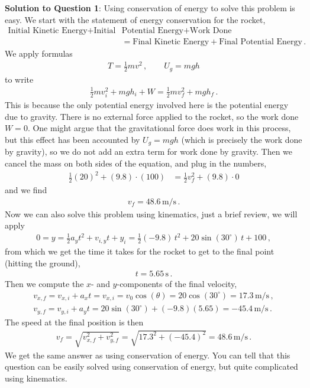 \documentclass[11pt]{article}
\begin{document}
\newpage
\textbf{Solution to Question 1}: Using conservation of energy to solve this problem is easy. We start with the statement of energy conservation for the rocket, 
\begin{align*}
\text{Initial Kinetic Energy} +
\text{Initial }&\text{Potential Energy} + \text{Work Done} \\
&= 
\text{Final Kinetic Energy} +
\text{Final Potential Energy}\,.
\end{align*}
We apply formulas 
\begin{align*}
T = \frac{1}{2}mv^2\,,\qquad
U_g = mgh
\end{align*}
to write
\begin{align*}
\frac{1}{2}mv_i^2 + mgh_i + W = \frac{1}{2}mv_f^2 + mgh_f\,.
\end{align*}
This is because the only potential energy involved here is the potential energy due to gravity. There is no external force applied to the rocket, so the work done $W = 0$. One might argue that the gravitational force does work in this process, but this effect has been accounted by $U_g = mgh$ (which is precisely the work done by gravity), so we do not add an extra term for work done by gravity. Then we cancel the mass on both sides of the equation, and plug in the numbers, 
\begin{align*}
\frac{1}{2}(20)^2 + (9.8)\cdot (100) &= \frac{1}{2}v_f^2 + (9.8)\cdot 0
\end{align*}
and we find
\begin{align*}
v_f = 48.6\,\text{m/s}\,.
\end{align*}
Now we can also solve this problem using kinematics, just a brief review, we will apply 
\begin{align*}
0 = y = \frac{1}{2}a_yt^2 + v_{i,y}t + y_i = \frac{1}{2}(-9.8)\,t^2 +20 \sin(30^\circ)\,t + 100\,, 
\end{align*}
from which we get the time it takes for the rocket to get to the final point (hitting the ground), 
\begin{align*}
t = 5.65\,\text{s}\,.
\end{align*}
Then we compute the $x$- and $y$-components of the final velocity, 
\begin{align*}
v_{x,f} = v_{x,i} + a_x t = v_{x,i} = v_0 \cos(\theta) = 20 \cos(30^\circ) = 17.3\,\text{m/s}\,,\\
v_{y,f} = v_{y,i} + a_y t =  20 \sin(30^\circ)+(-9.8)(5.65) =- 45.4\,\text{m/s}\,.
\end{align*}
The speed at the final position is then
\begin{align*}
v_f = \sqrt{v_{x,f}^2 + v_{y,f}^2} = \sqrt{17.3^2 + (-45.4)^2} = 48.6\,\text{m/s}\,.
\end{align*}
We get the same answer as using conservation of energy. You can tell that this question can be easily solved using conservation of energy, but quite complicated using kinematics. \\
\end{document}
